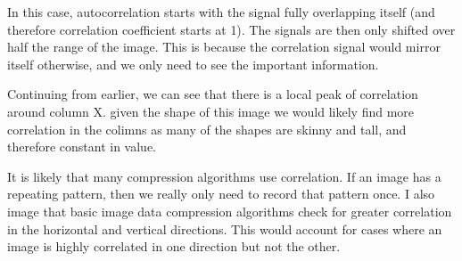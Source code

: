 In this case, autocorrelation starts with the signal fully overlapping itself
(and therefore correlation coefficient starts at 1). The signals are then only shifted
over half the range of the image. This is because the correlation signal would
mirror itself otherwise, and we only need to see the important information.

Continuing from earlier, we can see that there is a local peak of correlation
around column X. given the shape of this image we would likely find more
correlation in the colimns as many of the shapes are skinny and tall, and
therefore constant in value.

It is likely that many compression algorithms use correlation. If an image has a
repeating pattern, then we really only need to record that pattern once. I also
image that basic image data compression algorithms check for greater correlation
in the horizontal and vertical directions. This would account for cases where an
image is highly correlated in one direction but not the other.

